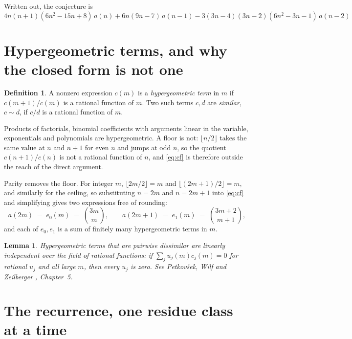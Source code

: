 \documentclass[11pt,a4paper]{article}
\theoremstyle{plain}
\newtheorem{lemma}[theorem]{Lemma}
\theoremstyle{definition}
\newtheorem{definition}[theorem]{Definition}
\begin{document}
Written out, the conjecture is
\begin{equation}\label{eq:conj}
4 n \left(n + 1\right) \left(6 n^{2} - 15 n + 8\right)\,a(n) + 6 n \left(9 n - 7\right)\,a(n-1) -  3 \left(3 n - 4\right) \left(3 n - 2\right) \left(6 n^{2} - 3 n - 1\right)\,a(n-2)
\end{equation}

\section{Hypergeometric terms, and why the closed form is not one}

\begin{definition}
A nonzero expression $c(m)$ is a \emph{hypergeometric term} in $m$ if $c(m+1)/c(m)$ is a
rational function of $m$. Two such terms $c,d$ are \emph{similar}, $c\sim d$, if $c/d$ is a
rational function of $m$.
\end{definition}

Products of factorials, binomial coefficients with arguments linear in the variable,
exponentials and polynomials are hypergeometric. A floor is not: $\lfloor n/2\rfloor$ takes
the same value at $n$ and $n+1$ for even $n$ and jumps at odd $n$, so the quotient
$c(n+1)/c(n)$ is not a rational function of $n$, and \eqref{eq:cf} is therefore outside the
reach of the direct argument.

Parity removes the floor. For integer $m$,
$\lfloor 2m/2\rfloor=m$ and $\lfloor (2m+1)/2\rfloor=m$, and similarly for the ceiling, so
substituting $n=2m$ and $n=2m+1$ into \eqref{eq:cf} and simplifying gives two expressions
free of rounding:
\begin{equation}\label{eq:halves}
a(2m)\;=\;e_{0}(m)\;=\;{\binom{3 m}{m}},
\qquad
a(2m+1)\;=\;e_{1}(m)\;=\;{\binom{3 m + 2}{m + 1}},
\end{equation}
and each of $e_{0},e_{1}$ is a sum of finitely many hypergeometric terms in $m$.

\begin{lemma}\label{lem:indep}
Hypergeometric terms that are pairwise dissimilar are linearly independent over the field
of rational functions: if $\sum_{j}u_{j}(m)c_{j}(m)=0$ for rational $u_{j}$ and all large
$m$, then every $u_{j}$ is zero. See Petkov\v{s}ek, Wilf and Zeilberger \cite{AB},
Chapter~5.
\end{lemma}

\section{The recurrence, one residue class at a time}
\end{document}
